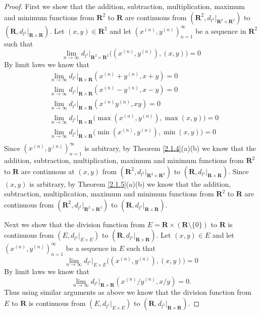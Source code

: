 \begin{proof}
    First we show that the addition, subtraction, multiplication, maximum and minimum functions from \(\mathbf{R}^2\) to \(\mathbf{R}\) are continuous from \((\mathbf{R}^2, d_{l^1}|_{\mathbf{R}^2 \times \mathbf{R}^2})\) to \((\mathbf{R}, d_{l^1}|_{\mathbf{R} \times \mathbf{R}})\).
    Let \((x, y) \in \mathbf{R}^2\) and let \((x^{(n)}, y^{(n)})_{n = 1}^\infty\) be a sequence in \(\mathbf{R}^2\) such that
    \[
        \lim_{n \to \infty} d_{l^1}|_{\mathbf{R}^2 \times \mathbf{R}^2}\big((x^{(n)}, y^{(n)}), (x, y)\big) = 0
    \]
    By limit laws we know that
    \begin{align*}
         & \lim_{n \to \infty} d_{l^1}|_{\mathbf{R} \times \mathbf{R}}(x^{(n)} + y^{(n)}, x + y) = 0                   \\
         & \lim_{n \to \infty} d_{l^1}|_{\mathbf{R} \times \mathbf{R}}(x^{(n)} - y^{(n)}, x - y) = 0                   \\
         & \lim_{n \to \infty} d_{l^1}|_{\mathbf{R} \times \mathbf{R}}(x^{(n)} y^{(n)}, xy) = 0                        \\
         & \lim_{n \to \infty} d_{l^1}|_{\mathbf{R} \times \mathbf{R}}\big(\max(x^{(n)}, y^{(n)}), \max(x, y)\big) = 0 \\
         & \lim_{n \to \infty} d_{l^1}|_{\mathbf{R} \times \mathbf{R}}\big(\min(x^{(n)}, y^{(n)}), \min(x, y)\big) = 0 \\
    \end{align*}
    Since \((x^{(n)}, y^{(n)})_{n = 1}^\infty\) is arbitrary, by Theorem \ref{2.1.4}(a)(b) we know that the addition, subtraction, multiplication, maximum and minimum functions from \(\mathbf{R}^2\) to \(\mathbf{R}\) are continuous at \((x, y)\) from \((\mathbf{R}^2, d_{l^1}|_{\mathbf{R}^2 \times \mathbf{R}^2})\) to \((\mathbf{R}, d_{l^1}|_{\mathbf{R} \times \mathbf{R}})\).
    Since \((x, y)\) is arbitrary, by Theorem \ref{2.1.5}(a)(b) we know that the addition, subtraction, multiplication, maximum and minimum functions from \(\mathbf{R}^2\) to \(\mathbf{R}\) are continuous from \((\mathbf{R}^2, d_{l^1}|_{\mathbf{R}^2 \times \mathbf{R}^2})\) to \((\mathbf{R}, d_{l^1}|_{\mathbf{R} \times \mathbf{R}})\).

    Next we show that the division function from \(E = \mathbf{R} \times (\mathbf{R} \setminus \{0\})\) to \(\mathbf{R}\) is continuous from \((E, d_{l^1}|_{E \times E})\) to \((\mathbf{R}, d_{l^1}|_{\mathbf{R} \times \mathbf{R}})\).
    Let \((x, y) \in E\) and let \((x^{(n)}, y^{(n)})_{n = 1}^\infty\) be a sequence in \(E\) such that
    \[
        \lim_{n \to \infty} d_{l^1}|_{E \times E}\big((x^{(n)}, y^{(n)}), (x, y)\big) = 0
    \]
    By limit laws we know that
    \[
        \lim_{n \to \infty} d_{l^1}|_{\mathbf{R} \times \mathbf{R}}(x^{(n)} / y^{(n)}, x / y) = 0.
    \]
    Thus using similar arguments as above we know that the division function from \(E\) to \(\mathbf{R}\) is continuous from \((E, d_{l^1}|_{E \times E})\) to \((\mathbf{R}, d_{l^1}|_{\mathbf{R} \times \mathbf{R}})\).


\end{proof}
